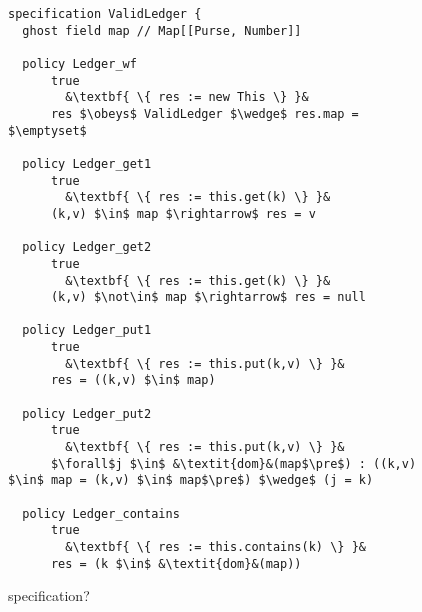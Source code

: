 \begin{figure*}[hbt]
\begin{lstlisting}[escapechar=&]
specification ValidLedger {
  ghost field map // Map[[Purse, Number]]

  policy Ledger_wf 
      true
        &\textbf{ \{ res := new This \} }&
      res $\obeys$ ValidLedger $\wedge$ res.map = $\emptyset$
  
  policy Ledger_get1
      true
        &\textbf{ \{ res := this.get(k) \} }&
      (k,v) $\in$ map $\rightarrow$ res = v

  policy Ledger_get2
      true
        &\textbf{ \{ res := this.get(k) \} }&
      (k,v) $\not\in$ map $\rightarrow$ res = null

  policy Ledger_put1
      true
        &\textbf{ \{ res := this.put(k,v) \} }&
      res = ((k,v) $\in$ map) 

  policy Ledger_put2
      true
        &\textbf{ \{ res := this.put(k,v) \} }&
      $\forall$j $\in$ &\textit{dom}&(map$\pre$) : ((k,v) $\in$ map = (k,v) $\in$ map$\pre$) $\wedge$ (j = k)

  policy Ledger_contains 
      true
        &\textbf{ \{ res := this.contains(k) \} }&
      res = (k $\in$ &\textit{dom}&(map))
\end{lstlisting}
\caption{ specification?}
\label{fig:ValidLedger}
\end{figure*}



